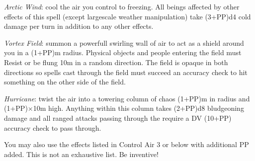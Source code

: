 \begin{multicols}{3}
{\begin{spellitemize}
\item {\it Arctic Wind}: cool the air you control to freezing. All beings affected by other effects of this spell (except large\minus{}scale weather manipulation) take (3+PP)d4 cold damage per turn in addition to any other effects. 
\item {\it Vortex Field}: summon a powerfull\comma{} swirling wall of air to act as a shield around you in a (1+PP)m radius. Physical objects and people entering the  field must Resist\comma{} or be flung 10m in a random direction. The field is opaque in both directions\comma{} so spells cast through the field must succeed an accuracy check to hit something on the other side of the field. 
\item {\it Hurricane}: twist the air into a towering column of chaos (1+PP)m in radius and (1+PP)$\times$10m high. Anything within this column takes (2+PP)d8 bludgeoning damage\comma{} and all ranged attacks passing through the require a DV (10+PP) accuracy check to pass through. 
\end{spellitemize}
You may also use the effects listed in Control Air 3 or below with \PPDifference{\DVExp}{\DVAdp} additional PP added. 
This is not an exhaustive list. Be inventive!}
\end{multicols}
